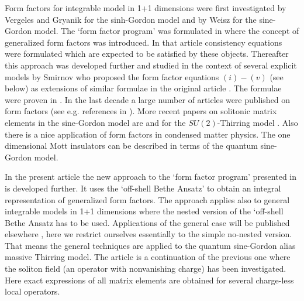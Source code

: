 \documentclass[a4paper,a4paper]{article}
\begin{document}
Form factors for integrable model in 1+1 dimensions were first investigated
by Vergeles and Gryanik \cite{VG} for the sinh-Gordon model and by Weisz 
\cite{W} for the sine-Gordon model. The `form factor program' was formulated
in \cite{KW} where the concept of generalized form factors was introduced.
In that article consistency equations were formulated which are expected to
be satisfied by these objects. Thereafter this approach was developed
further and studied in the context of several explicit models by Smirnov 
\cite{Sm} who proposed the form factor equations $(i)-(v)$ (see below) as
extensions of similar formulae in the original article \cite{KW}. The
formulae were proven in \cite{BFKZ}. In the last decade a large number of
articles were published on form factors (see e.g. references in \cite{BFKZ}%
). More recent papers on solitonic matrix elements in the sine-Gordon model
are \cite{Lu,LZ} and for the $SU(2)$-Thirring model \cite{KLP,NPT,NT}. Also
there is a nice application \cite{GNT,CET} of form factors in condensed
matter physics. The one dimensional Mott insulators can be described in
terms of the quantum sine-Gordon model.

In the present article the new approach to the `form factor program'
presented in \cite{BFKZ} is developed further. It uses the `off-shell Bethe
Ansatz' to obtain an integral representation of generalized form factors.
The approach applies also to general integrable models in 1+1 dimensions
where the nested version \cite{BKZ} of the `off-shell Bethe Ansatz has to be
used. Applications of the general case will be published elsewhere \cite
{BFKZ1,BK3}, here we restrict ourselves essentially to the simple no-nested
version. That means the general techniques are applied to the quantum
sine-Gordon alias massive Thirring model. The article is a continuation of
the previous one \cite{BFKZ} where the soliton field (an operator with
nonvanishing charge) has been investigated. Here exact expressions of all
matrix elements are obtained for several charge-less local operators.
\end{document}
